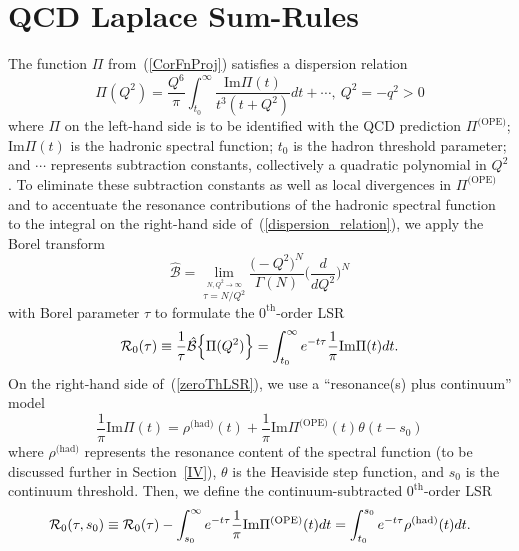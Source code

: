 \documentclass[11pt, letterpaper]{article}
\newcommand{\lsr}{\mathcal{R}_{0}}
\newcommand{\dif}[1]{d #1}
\begin{document}
\section{QCD Laplace Sum-Rules}\label{III}
The function $\Pi$ from~(\ref{CorFnProj}) satisfies a dispersion relation
%
\begin{equation}\label{dispersion_relation}
  \Pi(Q^2)=\frac{Q^6}{\pi}\int_{t_0}^{\infty}
  \frac{\mathrm{Im}\Pi(t)}{t^3(t+Q^2)}
  \dif{t} +\cdots,\ Q^2=-q^2>0
\end{equation}
%
where $\Pi$ on the left-hand side is to be identified with the QCD prediction $\Pi^{\text{(OPE)}}$;
$\mathrm{Im}\Pi(t)$ is the hadronic spectral function;
$t_0$ is the hadron threshold parameter;
and $\cdots$ represents subtraction constants, collectively a quadratic polynomial in $Q^2$.
To eliminate these subtraction constants as well as local divergences in 
$\Pi^{\text{(OPE)}}$ 
and to accentuate the resonance contributions of the hadronic spectral function
to the integral on the right-hand side of~(\ref{dispersion_relation}),
we apply the Borel transform 
%
\begin{equation}\label{borel}
  \hat{\mathcal{B}}=\!\lim_{\stackrel{N,Q^2\rightarrow\infty}{\tau=N/Q^2}}
  \!\frac{\big(-Q^2\big)^N}{\Gamma(N)}\bigg(\frac{d}{dQ^2}\bigg)^N
\end{equation}
%
with Borel parameter $\tau$
to formulate the $0^{\text{th}}$-order LSR~\cite{Shifman:1978bx}
%
\begin{equation} \label{zeroThLSR}
\lsr(\tau)\equiv\frac{1}{\tau}\hat{\mathcal{B}}\Big\{\Pi(Q^2) \Big\}\\
= \int_{t_0}^{\infty} e^{-t\tau}\frac{1}{\pi}\mathrm{Im}\Pi(t)\dif{t}.
\end{equation}
%
On the right-hand side of~(\ref{zeroThLSR}), we use a 
``resonance(s) plus continuum'' model
%
\begin{equation} \label{ResCont}
\frac{1}{\pi}\mathrm{Im}\Pi(t)
    =\rho^{\text{(had)}}(t)+\frac{1}{\pi}\mathrm{Im}\Pi^{\text{(OPE)}}(t)\theta(t-s_0)
\end{equation}
%
where 
$\rho^{\text{(had)}}$ represents the resonance content of the spectral function
(to be discussed further in Section~\ref{IV}),
$\theta$ is the Heaviside step function, and $s_0$ is the continuum threshold.
Then, we define the continuum-subtracted $0^{\text{th}}$-order LSR
%
\begin{equation} \label{subedLSR}
\lsr(\tau, s_0) \equiv \lsr(\tau) - \int_{s_0}^{\infty} e^{-t\tau}\frac{1}{\pi}\mathrm{Im}\Pi^{\text{(OPE)}}(t)\dif{t}\\
=\int_{t_0}^{s_0} e^{-t\tau} \rho^{\text{(had)}}(t)\dif{t}.
\end{equation}
\end{document}
